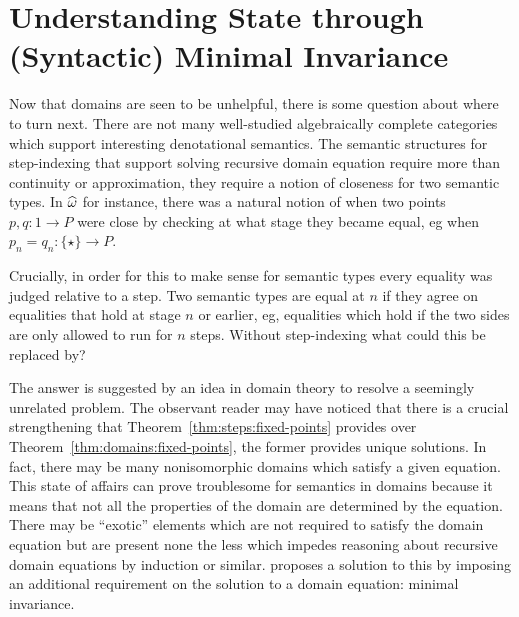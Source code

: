 \section{Understanding State through (Syntactic) Minimal Invariance}\label{sec:smi}

Now that domains are seen to be unhelpful, there is some question
about where to turn next. There are not many well-studied
algebraically complete categories~\citep{Freyd:70} which support
interesting denotational semantics. The semantic structures for
step-indexing that support solving recursive domain equation require
more than continuity or approximation, they require a notion of
closeness for two semantic types. In $\widehat{\omega}$ for
instance, there was a natural notion of when two points
$p, q : 1 \to P$ were close by checking at what stage they became
equal, eg when $p_n = q_n : \{\star\} \to P$.

Crucially, in order for this to make sense for semantic types every
equality was judged relative to a step. Two semantic types are equal
at $n$ if they agree on equalities that hold at stage $n$ or earlier,
eg, equalities which hold if the two sides are only allowed to run for
$n$ steps. Without step-indexing what could this be replaced by?

The answer is suggested by an idea in domain theory to resolve a
seemingly unrelated problem. The observant reader may have noticed
that there is a crucial strengthening that
Theorem~\ref{thm:steps:fixed-points} provides over
Theorem~\ref{thm:domains:fixed-points}, the former provides unique
solutions. In fact, there may be many nonisomorphic domains which
satisfy a given equation. This state of affairs can prove troublesome
for semantics in domains because it means that not all the properties
of the domain are determined by the equation. There may be ``exotic''
elements which are not required to satisfy the domain equation but are
present none the less which impedes reasoning about recursive domain
equations by induction or similar. \citet{Pitts:96} proposes a
solution to this by imposing an additional requirement on the solution
to a domain equation: minimal invariance.

